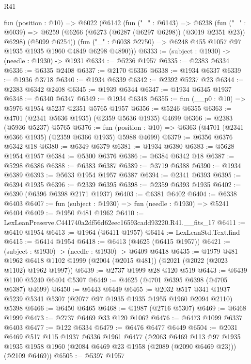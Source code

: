 \begin{lexlean}{R41}
\begin{coremodule}
  fun (position : @10) =>
  @6022
    (@6142
      (fun ("_" : @6143) =>
      @6238
        (fun ("_" : @6039) =>
        @6259 (@6266 (@6273 (@6287 (@6297 @6298)) (@3019 @2351 @23)) @6298) (@5099 @6254))
        (fun ("_" : @6038 @2750) => @6248 @455 @1057 @97 @1935 @1935 @1960 @4849 @6298 @4890)))
@6333 := (subject : @1930) -> (needle : @1930) -> @1931
@6334 := @5236 @1957
@6335 := @2383 @6334
@6336 := @6335 @2408
@6337 := @2170 @6336
@6338 := @1934 @6337
@6339 := @1936 @3718
@6340 := @1934 @6339
@6342 := @2392 @5237 @23
@6344 := @2383 @6342 @2408
@6345 := @1939 @6344
@6347 := @1934 @6345 @1937
@6348 := @6340 @6347
@6349 := @1934 @6348
@6355 := fun (__p0 : @10) => @5976 @1954 @5237 @2351 @5765 @1957
@6356 := @5246 @6355
@6363 := @4701 (@2341 @5636 @1935) (@2359 @5636 @1935) @4699
@6366 := @2383 (@5936 @5237) @5765
@6376 := fun (position : @10) => @6363 (@4701 (@2341 @6366 @1935) (@2359 @6366 @1935) @5988 @4699)
@6379 := @6356 @6376 @6342 @18
@6380 := @6349 @6379
@6381 := @1934 @6380
@6383 := @5628 @1954 @1957
@6384 := @5300 @6376
@6386 := @6384 @6342 @18
@6387 := @5298 @6386
@6388 := @6383 @6387
@6389 := @3719 @6388
@6390 := @1934 @6389
@6393 := @5633 @1954 @1957 @6387
@6394 := @2341 @6393
@6395 := @6394 @1935
@6396 := @2339 @6395
@6398 := @2359 @6393 @1935
@6402 := @6390 (@6396 @6398 @2171 @1937)
@6403 := @6381 @6402
@6404 := @6338 @6403
@6407 := fun (subject : @1930) => fun (needle : @1930) => @5241 @6404
@6409 := @1950 @481 @1962
@6410 := LexLeanPreserve.C441740a2df56d62eec16593cadd93220.R41.__fits_17
@6411 := @6410 @1954
@6413 := @1964 (@6411 @1957)
@6414 := LexLeanStd.Text.find
@6415 := @6414 @1954
@6418 := @6413 (@4625 (@6415 @1957))
@6421 := (subject : @1930) -> (needle : @1930) -> @6409 @6418
@6435 := @1979
    @481
    @1962
    @6418
    @1102
    @1999
    (@2004 (@2015 @481))
    (@2021 (@2022 (@2023 @1102) @1962 @1997))
@6439 := @2737 @1999 @28 @120 @519
@6443 := @6439 @1100 @5240 @6404 @5307
@6449 := @4625 (@4701 @6395 @6398 (@4705 @6387) @4699)
@6450 := @6443 @6449
@6465 := @2032
    @517
    @341
    @1937
    @5239
    @5341
    @5307
    (@2077 @97 @1935 @1935 @1955 @1960 @2094 @2110)
    @5398
@6466 := @6450 @6465
@6468 := @1987 (@2716 @5307)
@6469 := @6468 @1999
@6473 := @2737 @6469 @33 @120 @1062
@6476 := @6473 @1099 @6337 @6403
@6477 := @122 @6334
@6479 := @6476 @6477 @6449
@6504 := @2031
    @6469
    @517
    @115
    @1937
    @6336
    @1961
    @6477
    (@2063
      @6469
      @113
      @97
      @1935
      @1935
      @1958
      @1960
      (@2084 @6469 @23 @1958 (@2089 (@2090 @6469 @23)))
      (@2109 @6469))
@6505 := @5397 @1957

\end{coremodule}
\end{lexlean}
